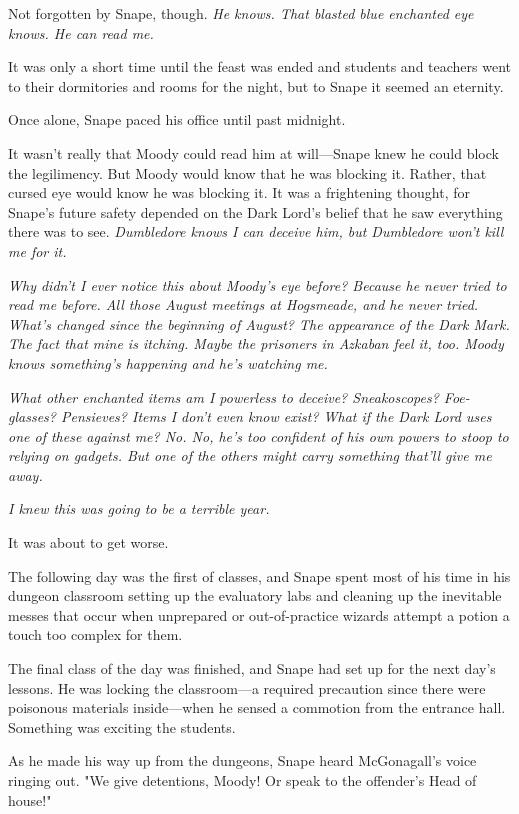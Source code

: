 Not forgotten by Snape, though. \emph{He knows. That blasted blue enchanted eye knows. He can read me.}

It was only a short time until the feast was ended and students and teachers went to their dormitories and rooms for the night, but to Snape it seemed an eternity.

Once alone, Snape paced his office until past midnight.

It wasn't really that Moody could read him at will—Snape knew he could block the legilimency. But Moody would know that he was blocking it. Rather, that cursed eye would know he was blocking it. It was a frightening thought, for Snape's future safety depended on the Dark Lord's belief that he saw everything there was to see. \emph{Dumbledore knows I can deceive him, but Dumbledore won't kill me for it.}

\emph{Why didn't I ever notice this about Moody's eye before? Because he never tried to read me before. All those August meetings at Hogsmeade, and he never tried. What's changed since the beginning of August? The appearance of the Dark Mark. The fact that mine is itching. Maybe the prisoners in Azkaban feel it, too. Moody knows something's happening and he's watching me.}

\emph{What other enchanted items am I powerless to deceive? Sneakoscopes? Foe-glasses? Pensieves? Items I don't even know exist? What if the Dark Lord uses one of these against me? No. No, he's too confident of his own powers to stoop to relying on gadgets. But one of the others might carry something that'll give me away.}

\emph{I knew this was going to be a terrible year.}

It was about to get worse.

The following day was the first of classes, and Snape spent most of his time in his dungeon classroom setting up the evaluatory labs and cleaning up the inevitable messes that occur when unprepared or out-of-practice wizards attempt a potion a touch too complex for them.

The final class of the day was finished, and Snape had set up for the next day's lessons. He was locking the classroom—a required precaution since there were poisonous materials inside—when he sensed a commotion from the entrance hall. Something was exciting the students.

As he made his way up from the dungeons, Snape heard McGonagall's voice ringing out. "We give detentions, Moody! Or speak to the offender's Head of house!"


